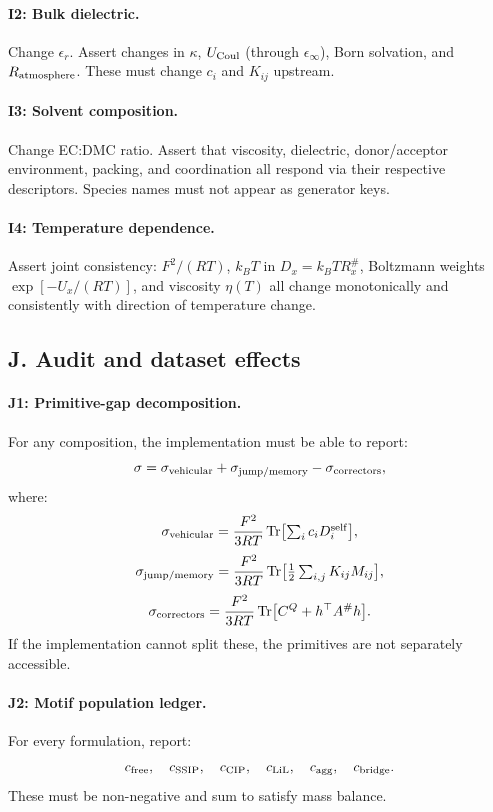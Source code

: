 \documentclass[11pt]{article}
\newcommand{\Tr}{\operatorname{Tr}}
\begin{document}
\paragraph{I2: Bulk dielectric.}
Change \(\epsilon_r\). Assert changes in \(\kappa\),
\(U_{\rm Coul}\) (through \(\epsilon_\infty\)), Born solvation, and
\(R_{\rm atmosphere}\). These must change \(c_i\) and \(K_{ij}\) upstream.

\paragraph{I3: Solvent composition.}
Change EC:DMC ratio. Assert that viscosity, dielectric, donor/acceptor
environment, packing, and coordination all respond via their respective
descriptors. Species names must not appear as generator keys.

\paragraph{I4: Temperature dependence.}
Assert joint consistency: \(F^2/(RT)\), \(k_BT\) in \(D_x=k_BTR_x^\#\),
Boltzmann weights \(\exp[-U_x/(RT)]\), and viscosity \(\eta(T)\) all change
monotonically and consistently with direction of temperature change.

\subsection{J. Audit and dataset effects}

\paragraph{J1: Primitive-gap decomposition.}
For any composition, the implementation must be able to report:
\[
\sigma = \sigma_{\rm vehicular} + \sigma_{\rm jump/memory} - \sigma_{\rm correctors},
\]
where:
\[
\sigma_{\rm vehicular}
=
\frac{F^2}{3RT}
\Tr\bigl[\textstyle\sum_i c_iD_i^{\rm self}\bigr],
\]
\[
\sigma_{\rm jump/memory}
=
\frac{F^2}{3RT}
\Tr\bigl[\tfrac12\textstyle\sum_{i,j}K_{ij}M_{ij}\bigr],
\]
\[
\sigma_{\rm correctors}
=
\frac{F^2}{3RT}
\Tr\bigl[C^Q+h^\top A^\#h\bigr].
\]
If the implementation cannot split these, the primitives are not separately
accessible.

\paragraph{J2: Motif population ledger.}
For every formulation, report:
\[
c_{\rm free},\quad c_{\rm SSIP},\quad c_{\rm CIP},
\quad c_{\rm LiL},\quad c_{\rm agg},\quad c_{\rm bridge}.
\]
These must be non-negative and sum to satisfy mass balance.
\end{document}
